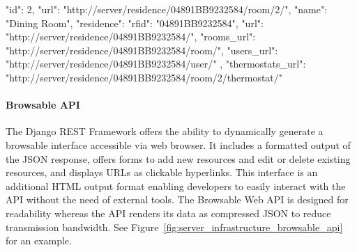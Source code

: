 \begin{snippet}[language=JavaScript,label={lst:room-json-example},caption={Example representation of the Room resource at \nolinkurl{http://server/residence/04891BB9232584/room/2/}.
		The \highlight{url} field determines the URL of the represented resource.
		Within the \highlight{residence} field the representation of the associated Residence resource is nested.
		The included Residence representation has its own \highlight{url} field.
		Collections of the Residence's Rooms and Users are not nested but referenced via URL to limit the response size.}]
	{
		"id": 2,
		"url": "http://server/residence/04891BB9232584/room/2/",
		"name": "Dining Room",
		"residence": {
			"rfid": "04891BB9232584",
			"url": "http://server/residence/04891BB9232584/",
			"rooms_url": "http://server/residence/04891BB9232584/room/",
			"users_url": "http://server/residence/04891BB9232584/user/"
		},
		"thermostats_url": "http://server/residence/04891BB9232584/room/2/thermostat/"
	}
\end{snippet}


\paragraph{Browsable API}

The Django REST Framework offers the ability to dynamically generate a browsable interface accessible via web browser.
It includes a formatted output of the JSON response, offers forms to add new resources and edit or delete existing resources, and displays URLs as clickable hyperlinks.
This interface is an additional HTML output format enabling developers to easily interact with the API without the need of external tools.
The Browsable Web API is designed for readability whereas the API renders its data as compressed JSON to reduce transmission bandwidth. 
See Figure~\ref{fig:server_infrastructure_browsable_api} for an example.

